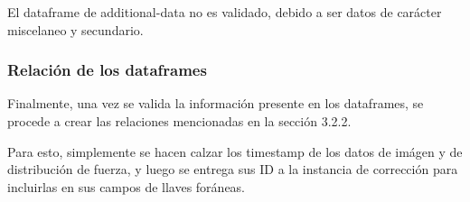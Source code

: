 El dataframe de additional-data no es validado, debido a ser datos de carácter miscelaneo y secundario.

\subsubsection{Relación de los dataframes}

Finalmente, una vez se valida la información presente en los dataframes, se procede a crear las relaciones mencionadas en la sección 3.2.2.

Para esto, simplemente se hacen calzar los timestamp de los datos de imágen y de distribución de fuerza, y luego se entrega sus ID a la instancia de corrección para incluirlas en sus campos de llaves foráneas.